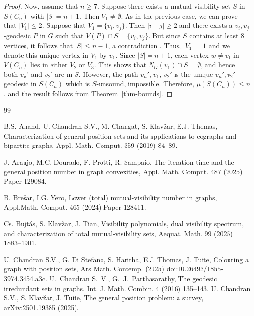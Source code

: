 \documentclass[a4paper,12pt]{article}
\begin{document}
{\begin{proof}
 Now, assume that  $n\geq 7$.  Suppose there exists a mutual visibility set $S$ in $S(C_n)$ with $|S|= n+1$. Then $V_1\neq\emptyset$. As in the previous case, we can prove that $|V_1|\leq 2$.  Suppose that $V_1=\{v_i,v_j\}$. Then $|i-j|\geq 2$ and there exists a $v_i,v_j$-geodesic $P$ in $G$ such that $V(P)\cap S=\{v_i,v_j\}$.  But since $S$ contains at least 8 vertices, it follows that  $|S|\leq n-1$,  a contradiction . Thus, $|V_1|=1$ and we denote this unique vertex in $V_1$ by $v_1$. Since $|S|=n+1$, each vertex $w\neq v_1$ in $V(C_n)$ lies in either $V_2$ or $V_3$. This shows that  $N_G(v_1)\cap S=\emptyset$, and hence both $v_{n}'$ and $v_{2}'$ are in $S$. However, the path $v_{n}',\,v_1,\,v_{2}'$ is the unique $v_n',v_2'$-geodesic in $S(C_n)$ which is $S$-unsound, impossible. Therefore, $\mu(S(C_n))\leq n$, and the result follows from Theorem~\ref{thm-bounds}.
 
\end{proof}








\begin{thebibliography}{99}



B.S. Anand, U. Chandran S.V., M. Changat, S. Klavžar, E.J. Thomas, Characterization of general position sets and its applications to cographs and bipartite graphs, Appl. Math. Comput. 359 (2019) 84–89.

 
  J. Araujo, M.C. Dourado, F. Protti, R. Sampaio, The iteration time and the general position number in graph convexities, Appl. Math. Comput. 487 (2025) Paper 129084.

  B. Brešar, I.G. Yero, Lower (total) mutual-visibility number in graphs, Appl.Math. Comput. 465 (2024) Paper 128411.

  Cs. Bujtás, S. Klavžar, J. Tian, Visibility polynomials, dual visibility spectrum, and characterization of total mutual-visibility sets, Aequat. Math. 99 (2025) 1883–1901.

  U. Chandran S.V., G. Di Stefano, S. Haritha, E.J. Thomas, J. Tuite, Colouring a graph with position sets, Ars Math. Contemp. (2025) doi:10.26493/1855-3974.3454.a3c.
   U.~Chandran S.~V., G.~J.~Parthasarathy, The geodesic irredundant sets in graphs,  Int. J. Math. Combin. 4 (2016) 135--143.
 U. Chandran S.V., S. Klavžar, J. Tuite, The general position problem: a survey, arXiv:2501.19385 (2025).


\end{thebibliography}}
\end{document}
